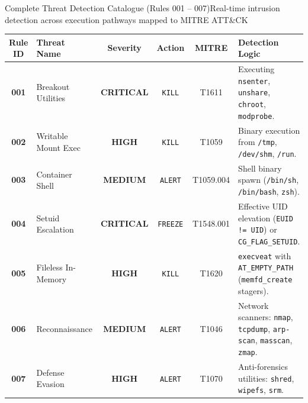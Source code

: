 \documentclass[aspectratio=169,10pt]{beamer}
\begin{document}
\begin{frame}{Complete Threat Detection Catalogue (Rules 001 -- 007)}{Real-time intrusion detection across execution pathways mapped to MITRE ATT\&CK}
  \scriptsize
  \begin{tabularx}{\textwidth}{c l c c c X}
    \toprule
    \textbf{Rule ID} & \textbf{Threat Name} & \textbf{Severity} & \textbf{Action} & \textbf{MITRE} & \textbf{Detection Logic} \\
    \midrule
    \textbf{001} & Breakout Utilities & \textcolor{crimsonDark}{\textbf{CRITICAL}} & \texttt{KILL} & T1611 & Executing \texttt{nsenter}, \texttt{unshare}, \texttt{chroot}, \texttt{modprobe}. \\
    \textbf{002} & Writable Mount Exec & \textcolor{amberDark}{\textbf{HIGH}} & \texttt{KILL} & T1059 & Binary execution from \texttt{/tmp}, \texttt{/dev/shm}, \texttt{/run}. \\
    \textbf{003} & Container Shell & \textbf{MEDIUM} & \texttt{ALERT} & T1059.004 & Shell binary spawn (\texttt{/bin/sh}, \texttt{/bin/bash}, \texttt{zsh}). \\
    \textbf{004} & Setuid Escalation & \textcolor{crimsonDark}{\textbf{CRITICAL}} & \texttt{FREEZE} & T1548.001 & Effective UID elevation (\texttt{EUID != UID}) or \texttt{CG\_FLAG\_SETUID}. \\
    \textbf{005} & Fileless In-Memory & \textcolor{amberDark}{\textbf{HIGH}} & \texttt{KILL} & T1620 & \texttt{execveat} with \texttt{AT\_EMPTY\_PATH} (\texttt{memfd\_create} stagers). \\
    \textbf{006} & Reconnaissance & \textbf{MEDIUM} & \texttt{ALERT} & T1046 & Network scanners: \texttt{nmap}, \texttt{tcpdump}, \texttt{arp-scan}, \texttt{masscan}, \texttt{zmap}. \\
    \textbf{007} & Defense Evasion & \textcolor{amberDark}{\textbf{HIGH}} & \texttt{ALERT} & T1070 & Anti-forensics utilities: \texttt{shred}, \texttt{wipefs}, \texttt{srm}. \\
    \bottomrule
  \end{tabularx}
\end{frame}
\end{document}
